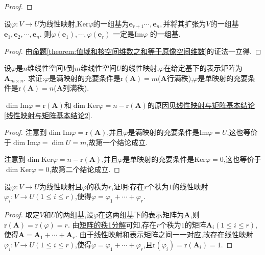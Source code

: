\documentclass[../../main.tex]{subfiles}%
\begin{document}
\begin{proof}
\end{proof}

\begin{corollary}\label{corollary:由核的基导出值域的基}
设\(\varphi:V\to U\)为线性映射,$\mathrm{Ker}\varphi $的一组基为$\boldsymbol{e}_{r+1}\cdots ,\boldsymbol{e}_n,$并将其扩张为$V$的一组基$\boldsymbol{e}_1,\boldsymbol{e}_2,\cdots ,\boldsymbol{e}_n.$
则$\varphi \left( \boldsymbol{e}_1 \right) ,\cdots ,\varphi \left( \boldsymbol{e}_r \right)$ 一定是Im$\varphi$ 的一组基.
\end{corollary}
\begin{proof}

由\hyperref[theorem:值域和核空间维数之和等于原像空间维数]{命题\ref{theorem:值域和核空间维数之和等于原像空间维数}}的证法一立得.


\end{proof}
\begin{proposition}\label{proposition:行/列满秩矩阵对应满/单射}
设\(\varphi\)是\(n\)维线性空间\(V\)到\(m\)维线性空间\(U\)的线性映射,\(\varphi\)在给定基下的表示矩阵为\(\boldsymbol{A}_{m\times n}\). 求证:\(\varphi\)是满映射的充要条件是\(\text{r}(\boldsymbol{A}) = m\)($\boldsymbol{A}$行满秩),\(\varphi\)是单映射的充要条件是\(\text{r}(\boldsymbol{A}) = n\)($\boldsymbol{A}$列满秩).
\end{proposition}
\begin{note}
\(\dim\text{Im}\varphi=\text{r}(\boldsymbol{A})\)和\(\dim\text{Ker}\varphi=n - \text{r}(\boldsymbol{A})\)的原因见\hyperref[线性映射与矩阵基本结论2]{线性映射与矩阵基本结论\ref{线性映射与矩阵基本结论2}}.
\end{note}
\begin{proof}

注意到\(\dim\text{Im}\varphi=\text{r}(\boldsymbol{A})\),并且\(\varphi\)是满映射的充要条件是\(\text{Im}\varphi = U\),这也等价于\(\dim\text{Im}\varphi=\dim U = m\),故第一个结论成立.

注意到\(\dim\text{Ker}\varphi=n - \text{r}(\boldsymbol{A})\),并且\(\varphi\)是单映射的充要条件是\(\text{Ker}\varphi = 0\),这也等价于\(\dim\text{Ker}\varphi = 0\),故第二个结论成立.

\end{proof}

\begin{proposition}\label{proposition:线性映射的秩1分解}
设\(\varphi:V\to U\)为线性映射且\(\varphi\)的秩为\(r\),证明:存在\(r\)个秩为\(1\)的线性映射\(\varphi_i:V\to U(1\leqslant  i\leqslant  r)\),使得\(\varphi=\varphi_1+\cdots+\varphi_r\).
\end{proposition}
\begin{proof}

取定\(V\)和\(U\)的两组基,设\(\varphi\)在这两组基下的表示矩阵为\(\boldsymbol{A}\),则\(\text{r}(\boldsymbol{A})=\text{r}(\varphi)=r\). 由\hyperref[proposition:矩阵的秩1分解]{矩阵的秩1分解}可知,存在\(r\)个秩为\(1\)的矩阵\(\boldsymbol{A}_i(1\leqslant  i\leqslant  r)\),使得\(\boldsymbol{A}=\boldsymbol{A}_1+\cdots+\boldsymbol{A}_r\). 由于线性映射和表示矩阵之间一一对应,故存在线性映射\(\varphi_i:V\to U(1\leqslant  i\leqslant  r)\),使得\(\varphi=\varphi_1+\cdots+\varphi_r\),且\(\text{r}(\varphi_i)=\text{r}(\boldsymbol{A}_i)=1\).

\end{proof}
\end{document}
